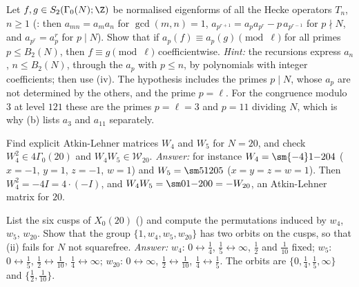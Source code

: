 \begin{exercise}\label{ex:modforms:ex-primes-to-n}
Let $f,g\in S_2(\Gamma_0(N);\Z)$ be normalised eigenforms of all the Hecke operators $T_n$, $n\ge1$ (: then $a_{mn}=a_ma_n$ for $\gcd(m,n)=1$,
$a_{p^{r+1}}=a_pa_{p^r}-p\,a_{p^{r-1}}$ for $p\nmid N$, and $a_{p^r}=a_p^r$ for $p\mid N$). Show that if $a_p(f)\equiv a_p(g)\pmod\ell$ for all primes $p\le B_2(N)$, then $f\equiv g\pmod\ell$
coefficientwise.
\emph{Hint:} the recursions express $a_n$, $n\le B_2(N)$, through the $a_p$ with $p\le n$, by polynomials with integer coefficients; then use (iv). The
hypothesis includes the primes $p\mid N$, whose $a_p$ are not determined by the others, and the prime $p=\ell$. For the congruence modulo $3$ at level $121$ these are the primes
$p=\ell=3$ and $p=11$ dividing $N$, which is why (b) lists $a_3$ and $a_{11}$ separately.
\end{exercise}

\begin{exercise}\label{ex:modforms:ex-al-existence}
Find explicit Atkin-Lehner matrices $W_4$ and $W_5$ for $N=20$, and check $W_4^2\in4\Gamma_0(20)$ and $W_4W_5\in\mathcal W_{20}$.
\emph{Answer:} for instance $W_4=\sm{-4}1{-20}4$ ($x=-1$, $y=1$, $z=-1$, $w=1$) and $W_5=\sm51{20}5$ ($x=y=z=w=1$). Then $W_4^2=-4I=4\cdot(-I)$, and
$W_4W_5=\sm01{-20}0=-W_{20}$, an Atkin-Lehner matrix for $20$.
\end{exercise}

\begin{exercise}\label{ex:modforms:ex-cusps20}
List the six cusps of $X_0(20)$ () and compute the permutations induced by $w_4$, $w_5$, $w_{20}$. Show that the group $\{1,w_4,w_5,w_{20}\}$ has two orbits on the
cusps, so that (ii) fails for $N$ not squarefree.
\emph{Answer:} $w_4$: $0\leftrightarrow\frac14$, $\frac15\leftrightarrow\infty$, $\frac12$ and $\frac1{10}$ fixed; $w_5$: $0\leftrightarrow\frac15$, $\frac12\leftrightarrow\frac1{10}$, $\frac14\leftrightarrow\infty$; $w_{20}$:
$0\leftrightarrow\infty$, $\frac12\leftrightarrow\frac1{10}$, $\frac14\leftrightarrow\frac15$. The orbits are $\{0,\frac14,\frac15,\infty\}$ and $\{\frac12,\frac1{10}\}$.
\end{exercise}

